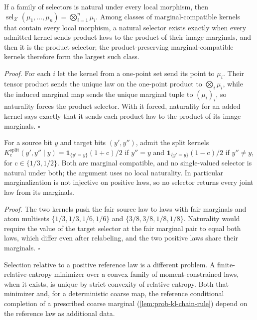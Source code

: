 \label{cor:hist-maximal-product-preserving-category}%
If a family of selectors is natural under every local morphism, then
$\operatorname{sel}_{\mathcal X}(\mu_1,\ldots,\mu_n)=\bigotimes_{i=1}^n\mu_i$.  Among
classes of marginal-compatible kernels that contain every local morphism, a natural
selector exists exactly when every admitted kernel sends product laws to the product of
their image marginals, and then it is the product selector; the product-preserving
marginal-compatible kernels therefore form the largest such class.  

\noindent\emph{Proof.}
For each $i$ let the kernel from a one-point set send its point to $\mu_i$.  Their
tensor product sends the unique law on the one-point product to $\bigotimes_i\mu_i$,
while the induced marginal map sends the unique marginal tuple to $(\mu_i)_i$, so
naturality forces the product selector.  With it forced, naturality for an added kernel
says exactly that it sends each product law to the product of its image marginals.
$\square$

For a source bit $y$ and target bits $(y',y'')$, admit the split kernels
$K^{\mathrm{split}}_{\mathrm c}(y',y''\mid y)=\mathbf 1_{\{y'=y\}}(1+\mathrm c)/2$ if
$y''=y$ and $\mathbf 1_{\{y'=y\}}(1-\mathrm c)/2$ if $y''\ne y$, for
$\mathrm c\in\{1/3,1/2\}$.  Both are marginal compatible, and no single-valued selector
is natural under both; the argument uses no local naturality.  In particular
marginalization is not injective on positive laws, so no selector returns every joint
law from its marginals.  

\noindent\emph{Proof.}
The two kernels push the fair source law to laws with fair marginals and atom multisets
$\{1/3,1/3,1/6,1/6\}$ and $\{3/8,3/8,1/8,1/8\}$.  Naturality would require the value of
the target selector at the fair marginal pair to equal both laws, which differ even after
relabeling, and the two positive laws share their marginals.  $\square$

Selection relative to a positive reference law is a different problem. A
finite-relative-entropy minimizer over a convex family of moment-constrained laws,
when it exists, is unique by strict convexity of relative entropy. Both that minimizer
and, for a deterministic coarse map, the reference conditional completion of a
prescribed coarse marginal (\cref{lem:prob-kl-chain-rule}) depend on the reference
law as additional data.

